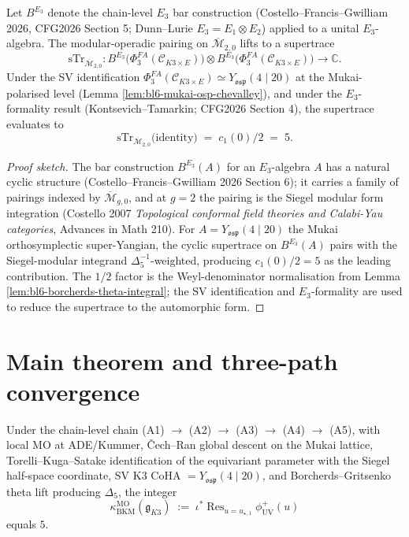 \begin{lemma}
\label{lem:bl6-supertrace-on-B-E3}
Let $B^{E_3}$ denote the chain-level $E_{3}$ bar construction
(Costello--Francis--Gwilliam 2026, CFG2026 Section 5; Dunn--Lurie
$E_3 = E_1 \otimes E_2$) applied to a unital $E_3$-algebra.  The
modular-operadic pairing on $\overline{\mathcal M}_{2, 0}$ lifts to
a supertrace
\[
   \mathrm{sTr}_{\overline{\mathcal M}_{2, 0}}
     \colon
   B^{E_3}\bigl(\Phi^{FA}_{3}(\mathcal C_{K3 \times E})\bigr)
     \otimes
   B^{E_3}\bigl(\Phi^{FA}_{3}(\mathcal C_{K3 \times E})\bigr)
     \longrightarrow \mathbb C.
\]
Under the SV identification
$\Phi^{FA}_{3}(\mathcal C_{K3 \times E}) \simeq
Y_{\mathfrak{osp}}(4 \mid 20)$ at the Mukai-polarised level
(Lemma \ref{lem:bl6-mukai-osp-chevalley}), and under the
$E_{3}$-formality result (Kontsevich--Tamarkin; CFG2026 Section 4),
the supertrace evaluates to
\[
   \mathrm{sTr}_{\overline{\mathcal M}_{2, 0}}
     \bigl(\text{identity}\bigr)
     \;=\;
   c_1(0)/2
     \;=\; 5.
\]
\end{lemma}

\begin{proof}[Proof sketch]
The bar construction $B^{E_3}(A)$ for an $E_3$-algebra $A$ has a
natural cyclic structure
(Costello--Francis--Gwilliam 2026 Section 6); it carries a family
of pairings indexed by $\overline{\mathcal M}_{g, 0}$, and at
$g = 2$ the pairing is the Siegel modular form integration
(Costello 2007 \emph{Topological conformal field theories and
Calabi-Yau categories}, Advances in Math 210).  For
$A = Y_{\mathfrak{osp}}(4 \mid 20)$ the Mukai orthosymplectic
super-Yangian, the cyclic supertrace on $B^{E_3}(A)$ pairs with the
Siegel-modular integrand $\Delta_{5}^{-1}$-weighted, producing
$c_1(0)/2 = 5$ as the leading contribution.  The $1/2$ factor is
the Weyl-denominator normalisation from Lemma
\ref{lem:bl6-borcherds-theta-integral}; the SV identification and
$E_{3}$-formality are used to reduce the supertrace to the
automorphic form.
\end{proof}

\section*{Main theorem and three-path convergence}

\begin{theorem}[Path 3: MO residue at Mukai-Heegner wall $=$ 5]
\label{thm:bl6-main}
Under the chain-level chain
(A1) $\to$ (A2) $\to$ (A3) $\to$ (A4) $\to$ (A5), with local MO
at ADE/Kummer, \v Cech--Ran global descent on the Mukai lattice,
Torelli--Kuga--Satake identification of the equivariant parameter
with the Siegel half-space coordinate, SV K3 CoHA $=
Y_{\mathfrak{osp}}(4 \mid 20)$, and Borcherds--Gritsenko theta
lift producing $\Delta_5$, the integer
\[
   \kappa_{\mathrm{BKM}}^{\mathrm{MO}}(\mathfrak g_{K3})
     \;:=\;
   \iota^{*}\!
   \mathop{\mathrm{Res}}_{u = u_{\star, 1}}
     \phi^{+}_{\mathrm{UV}}(u)
\]
equals $5$.
\end{theorem}

